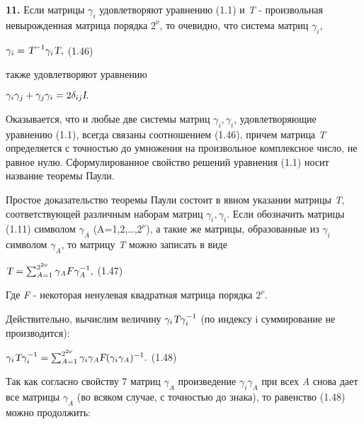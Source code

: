 \documentclass{article}
\begin{document}
{\textbf{11. }Если матрицы $\gamma_i$ удовлетворяют уравнению (1.1) и \textsl{T} - произвольная невырожденная матрица порядка $2^\nu$, то очевидно, что система матриц $\gamma_i$,\par
\begin{center}
$\gamma_{i}=\textsl{T}^{-1}\gamma_{i}\textsl{T},$     (1.46)\par
\end{center}
также удовлетворяют уравнению \par
\begin{center}
$\gamma_{i}\gamma_{j}+\gamma_{j}\gamma_{i}=2\delta_{ij}\textsl{I}.$\par
\end{center}
\hspace{0.2cm}
Оказывается, что и любые две системы матриц $\gamma_{i},\gamma_{i}$, удовлетворяющие уравнению (1.1), всегда связаны соотношением (1.46), причем матрица \textsl{T} определяется с точностью до умножения на произвольное комплексное число, не равное нулю. Сформулированное свойство решений уравнения (1.1) носит название теоремы Паули.\par
Простое доказательство теоремы Паули состоит в явном указании матрицы \textsl{T}, соответствующей различным наборам матриц $\gamma_{i},\gamma_{i}$. Если обозначить матрицы (1.11) символом $\gamma_{A}$ (A=1,2,\dots,$2^{\nu}$), а такие же матрицы, образованные из $\gamma_{i}$ символом $\gamma_{A}$, то матрицу \textsl{T} можно записать в виде\par
\begin{center}
$\textsl{T}=\sum_{A=1}^{2^{2\nu}}\gamma_{A}F\gamma^{-1}_{A},$     (1.47)\par
\end{center}
Где \textsl{F} - некоторая ненулевая квадратная матрица порядка $2^{\nu}$.\par
Действительно, вычислим величину $\gamma_{i}\textsl{T}\gamma^{-1}_{i}$ (по индексу i суммирование не производится):\par
\begin{center}
$\gamma_{i}\textsl{T}\gamma^{-1}_{i}=\sum_{A=1}^{2^{2\nu}}\gamma_{i}\gamma_{A}\textsl{F}(\gamma_{i}\gamma_{A})^{-1}. $   (1.48)\par
\end{center}
Так как согласно свойству 7 матриц $\gamma_{A}$ произведение  $\gamma_{i}\gamma_{A}$ при всех \textsl{A} снова дает все матрицы $\gamma_{A}$ (во всяком случае, с точностью до знака), то равенство (1.48) можно продолжить:\par
\begin{center}

\end{center}}
\end{document}
